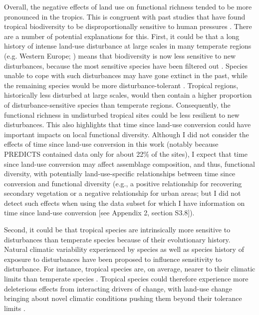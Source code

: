 Overall, the negative effects of land use on functional richness tended to be more pronounced in the tropics. This is congruent with past studies that have found tropical biodiversity to be disproportionally sensitive to human pressures \citep{Newbold2020, Martins2017}. There are a number of potential explanations for this. First, it could be that a long history of intense land-use disturbance at large scales in many temperate regions (e.g. Western Europe; \citet{Stephens2019}) means that biodiversity is now less sensitive to new disturbances, because the most sensitive species have been filtered out \citep{Balmford1996, Krauss2010, LeProvost2020, Munteanu2020}. Species unable to cope with such disturbances may have gone extinct in the past, while the remaining species would be more disturbance-tolerant \citep{Betts2019}. Tropical regions, historically less disturbed at large scales, would then contain a higher proportion of disturbance-sensitive species than temperate regions. Consequently, the functional richness in undisturbed tropical sites could be less resilient to new disturbances. This also highlights that time since land-use conversion could have important impacts on local functional diversity. Although I did not consider the effects of time since land-use conversion in this work (notably because PREDICTS contained data only for about 22\% of the sites), I expect that time since land-use conversion may affect assemblage composition, and thus, functional diversity, with potentially land-use-specific relationships between time since conversion and functional diversity (e.g., a positive relationship for recovering secondary vegetation or a negative relationship for urban areas; but I did not detect such effects when using the data subset for which I have information on time since land-use conversion [see Appendix 2, section S3.8]).

Second, it could be that tropical species are intrinsically more sensitive to disturbances than temperate species because of their evolutionary history. Natural climatic variability experienced by species as well as species history of exposure to disturbances have been proposed to influence sensitivity to disturbance. For instance, tropical species are, on average, nearer to their climatic limits than temperate species \citep{Deutsch2008, Sunday2014a}. Tropical species could therefore experience more deleterious effects from interacting drivers of change, with land-use change bringing about novel climatic conditions pushing them beyond their tolerance limits \citep{Frishkoff2016, Williams2020a}.

